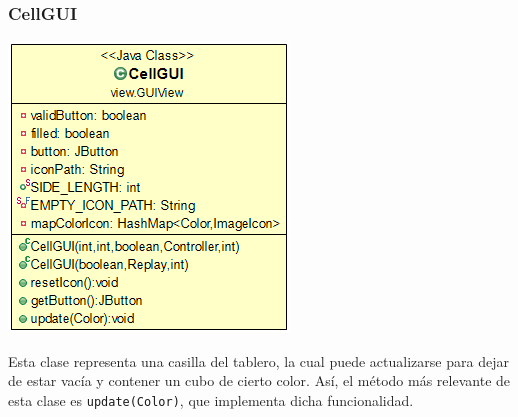 \documentclass[../DocumentoOficial.tex]{subfiles}
\begin{document}
\subsubsection{CellGUI}
\begin{center}
\includegraphics[scale=0.6]{cellgui.png}
\end{center}

Esta clase representa una casilla del tablero, la cual puede actualizarse para dejar de estar vacía y contener un cubo de cierto color. Así, el método más relevante de esta clase es \texttt{update(Color)}, que implementa dicha funcionalidad.
\end{document}
